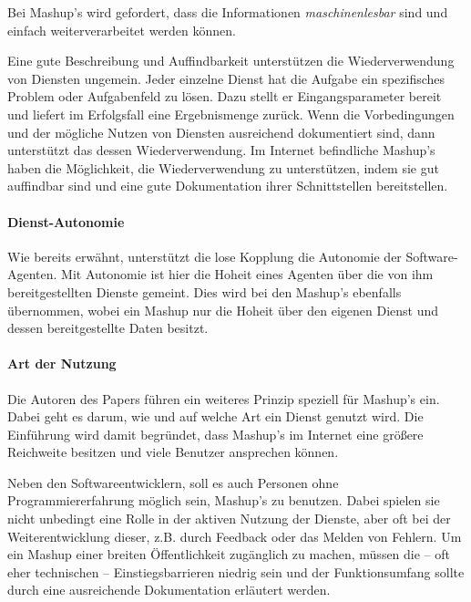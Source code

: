 \documentclass[11pt]{article}
\begin{document}
\newpage 
\noindent
Bei Mashup's wird gefordert, dass die Informationen \textit{maschinenlesbar} sind und einfach weiterverarbeitet werden können.

Eine gute Beschreibung und Auffindbarkeit unterstützen die Wiederverwendung von Diensten ungemein. Jeder einzelne Dienst hat die Aufgabe ein spezifisches Problem oder Aufgabenfeld zu lösen. Dazu stellt er Eingangsparameter bereit und liefert im Erfolgsfall eine Ergebnismenge zurück. Wenn die Vorbedingungen und der mögliche Nutzen von Diensten ausreichend dokumentiert sind, dann unterstützt das dessen Wiederverwendung. Im Internet befindliche Mashup's haben die Möglichkeit, die Wiederverwendung zu unterstützen, indem sie gut auffindbar sind und eine gute Dokumentation ihrer Schnittstellen bereitstellen. \cite[S. 2]{MASHUP-ELUCID}

%
%
\paragraph{Dienst-Autonomie} 

Wie bereits erwähnt, unterstützt die lose Kopplung die Autonomie der Software-Agenten. Mit Autonomie ist hier die Hoheit eines Agenten über die von ihm bereitgestellten Dienste gemeint. Dies wird bei den Mashup's ebenfalls übernommen, wobei ein Mashup nur die Hoheit über den eigenen Dienst und dessen bereitgestellte Daten besitzt. 


%
%
\paragraph{Art der Nutzung}

Die Autoren des Papers \cite{MASHUP-ELUCID} führen ein weiteres Prinzip speziell für Mashup's ein. Dabei geht es darum, wie und auf welche Art ein Dienst genutzt wird. Die Einführung wird damit begründet, dass Mashup's im Internet eine größere Reichweite besitzen und viele Benutzer ansprechen können.

Neben den Softwareentwicklern, soll es auch Personen ohne Programmiererfahrung möglich sein, Mashup's zu benutzen. Dabei spielen sie nicht unbedingt eine Rolle in der aktiven Nutzung der Dienste, aber oft bei der Weiterentwicklung dieser, z.B. durch Feedback oder das Melden von Fehlern. Um ein Mashup einer breiten Öffentlichkeit zugänglich zu machen, müssen die -- oft eher technischen -- Einstiegsbarrieren niedrig sein und der Funktionsumfang sollte durch eine ausreichende Dokumentation erläutert werden.
\end{document}
